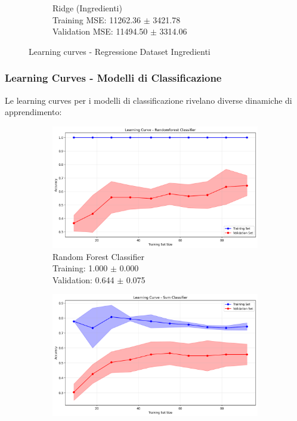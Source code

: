 \documentclass[12pt,a4paper]{article}
\begin{document}
\begin{figure}[H]
\begin{subfigure}{0.32\textwidth}
    \caption{Ridge (Ingredienti)\\Training MSE: 11262.36 $\pm$ 3421.78\\Validation MSE: 11494.50 $\pm$ 3314.06}
\end{subfigure}
\caption{Learning curves - Regressione Dataset Ingredienti}
\label{fig:learning_curves_regression_ingredienti}
\end{figure}

\subsubsection{Learning Curves - Modelli di Classificazione}

Le learning curves per i modelli di classificazione rivelano diverse dinamiche di apprendimento:

\begin{figure}[H]
\centering
\begin{subfigure}{0.32\textwidth}
    \includegraphics[width=\textwidth]{dati/learning_curve_ricette_randomforest_classifier.png}
    \caption{Random Forest Classifier\\Training: 1.000 $\pm$ 0.000\\Validation: 0.644 $\pm$ 0.075}
\end{subfigure}
\hfill
\begin{subfigure}{0.32\textwidth}
    \includegraphics[width=\textwidth]{dati/learning_curve_ricette_svm_classifier.png}

\end{subfigure}
\end{figure}
\end{document}

